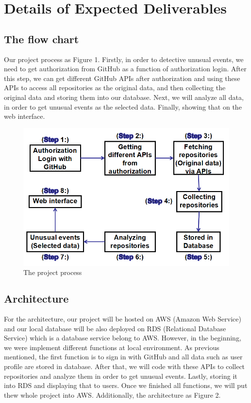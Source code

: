 \documentclass[conference]{IEEEtran}
\begin{document}
\section{Details of Expected Deliverables}
\subsection{The flow chart}
Our project process as Figure 1. Firstly, in order to detective unusual events, we need to get authorization from GitHub as a function of authorization login. After this step, we can get different GitHub APIs after authorization and using these APIs to access all repositories as the original data, and then collecting the original data and storing them into our database. Next, we will analyze all data, in order to get unusual events as the selected data. Finally, showing that on the web interface.

\begin{figure}[!ht]
\centering
\includegraphics[scale=0.5]{methodology}
\caption{The project process}
\end{figure}

\subsection{Architecture}
For the architecture, our project will be hosted on AWS (Amazon Web Service) and our local database will be also deployed on RDS (Relational Database Service) which is a database service belong to AWS. However, in the beginning, we were implement different functions at local environment. As previous mentioned, the first function is to sign in with GitHub and all data such as user profile are stored in database. After that, we will code with these APIs to collect repositories and analyze them in order to get unusual events. Lastly, storing it into RDS and displaying that to users. Once we finished all functions, we will put thew whole project into AWS. Additionally, the architecture as Figure 2.
\end{document}
